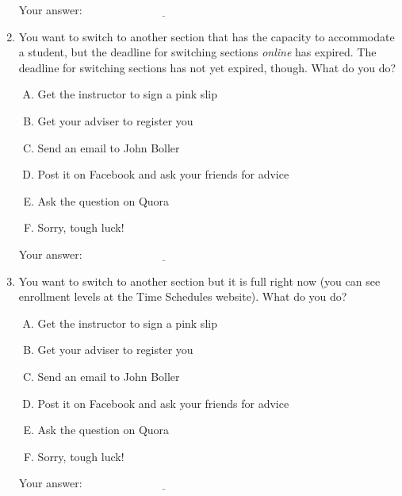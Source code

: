 \documentclass[10pt]{amsart}
\begin{document}
\begin{enumerate}
  \vspace{0.1in}
  Your answer: $\underline{\qquad\qquad\qquad\qquad\qquad\qquad\qquad}$
  \vspace{0.1in}

\item You want to switch to another section that has the capacity to
  accommodate a student, but the deadline for switching sections {\em
    online} has expired. The deadline for switching sections has not
  yet expired, though. What do you do?

  \begin{enumerate}[(A)]
  \item Get the instructor to sign a pink slip
  \item Get your adviser to register you
  \item Send an email to John Boller
  \item Post it on Facebook and ask your friends for advice
  \item Ask the question on Quora
  \item Sorry, tough luck!
  \end{enumerate}

  \vspace{0.1in}
  Your answer: $\underline{\qquad\qquad\qquad\qquad\qquad\qquad\qquad}$
  \vspace{0.1in}

\item You want to switch to another section but it is full right now
  (you can see enrollment levels at the Time Schedules website). What do
  you do?

  \begin{enumerate}[(A)]
  \item Get the instructor to sign a pink slip
  \item Get your adviser to register you
  \item Send an email to John Boller
  \item Post it on Facebook and ask your friends for advice
  \item Ask the question on Quora
  \item Sorry, tough luck!
  \end{enumerate}

  \vspace{0.1in}
  Your answer: $\underline{\qquad\qquad\qquad\qquad\qquad\qquad\qquad}$
  \vspace{0.1in}

\end{enumerate}
\end{document}
